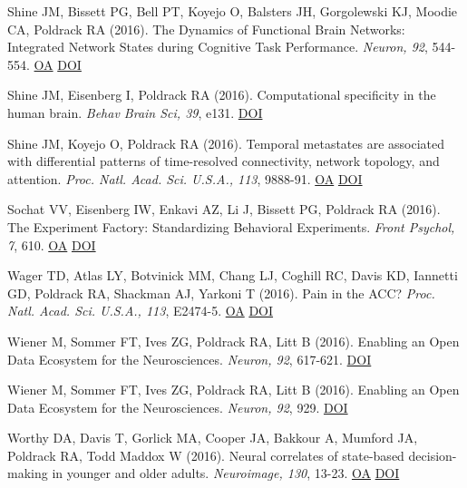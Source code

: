 Shine JM, Bissett PG, Bell PT, Koyejo O, Balsters JH, Gorgolewski KJ, Moodie CA, Poldrack RA (2016). The Dynamics of Functional Brain Networks: Integrated Network States during Cognitive Task Performance. \textit{Neuron, 92}, 544-554. \href{https://www.ncbi.nlm.nih.gov/pmc/articles/PMC5073034}{OA} \href{http://dx.doi.org/10.1016/j.neuron.2016.09.018}{DOI} \vspace{2mm}

Shine JM, Eisenberg I, Poldrack RA (2016). Computational specificity in the human brain. \textit{Behav Brain Sci, 39}, e131. \href{http://dx.doi.org/10.1017/s0140525x1500165x}{DOI} \vspace{2mm}

Shine JM, Koyejo O, Poldrack RA (2016). Temporal metastates are associated with differential patterns of time-resolved connectivity, network topology, and attention. \textit{Proc. Natl. Acad. Sci. U.S.A., 113}, 9888-91. \href{https://www.ncbi.nlm.nih.gov/pmc/articles/PMC5024627}{OA} \href{http://dx.doi.org/10.1073/pnas.1604898113}{DOI} \vspace{2mm}

Sochat VV, Eisenberg IW, Enkavi AZ, Li J, Bissett PG, Poldrack RA (2016). The Experiment Factory: Standardizing Behavioral Experiments. \textit{Front Psychol, 7}, 610. \href{https://www.ncbi.nlm.nih.gov/pmc/articles/PMC4844768}{OA} \href{http://dx.doi.org/10.3389/fpsyg.2016.00610}{DOI} \vspace{2mm}

Wager TD, Atlas LY, Botvinick MM, Chang LJ, Coghill RC, Davis KD, Iannetti GD, Poldrack RA, Shackman AJ, Yarkoni T (2016). Pain in the ACC? \textit{Proc. Natl. Acad. Sci. U.S.A., 113}, E2474-5. \href{https://www.ncbi.nlm.nih.gov/pmc/articles/PMC4983860}{OA} \href{http://dx.doi.org/10.1073/pnas.1600282113}{DOI} \vspace{2mm}

Wiener M, Sommer FT, Ives ZG, Poldrack RA, Litt B (2016). Enabling an Open Data Ecosystem for the Neurosciences. \textit{Neuron, 92}, 617-621. \href{http://dx.doi.org/10.1016/j.neuron.2016.10.037}{DOI} \vspace{2mm}

Wiener M, Sommer FT, Ives ZG, Poldrack RA, Litt B (2016). Enabling an Open Data Ecosystem for the Neurosciences. \textit{Neuron, 92}, 929. \href{http://dx.doi.org/10.1016/j.neuron.2016.11.009}{DOI} \vspace{2mm}

Worthy DA, Davis T, Gorlick MA, Cooper JA, Bakkour A, Mumford JA, Poldrack RA, Todd Maddox W (2016). Neural correlates of state-based decision-making in younger and older adults. \textit{Neuroimage, 130}, 13-23. \href{https://www.ncbi.nlm.nih.gov/pmc/articles/PMC4808466}{OA} \href{http://dx.doi.org/10.1016/j.neuroimage.2015.12.004}{DOI} \vspace{2mm}

